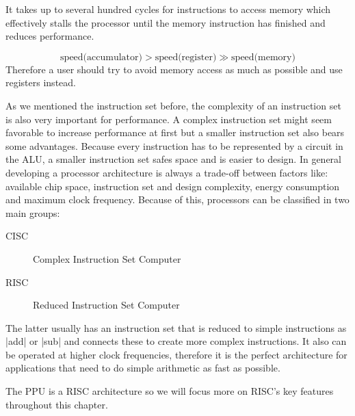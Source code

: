 It takes up to several hundred cycles for instructions to access memory which effectively stalls the processor until the memory instruction has finished and reduces performance.

\begin{equation*}
    \text{speed(accumulator)} > \text{speed(register)} \gg \text{speed(memory)}
\end{equation*}
Therefore a user should try to avoid memory access as much as possible and use registers instead.

As we mentioned the instruction set before, the complexity of an instruction set is also very important for performance. 
A complex instruction set might seem favorable to increase performance at first but a smaller instruction set also bears some advantages.
Because every instruction has to be represented by a circuit in the \ac{ALU}, a smaller instruction set safes space and is easier to design.
In general developing a processor architecture is always a trade-off between factors like: available chip space, instruction set and design complexity, energy consumption and maximum clock frequency.
Because of this, processors can be classified in two main groups:
\begin{description}
    \item[\acs{CISC}] Complex Instruction Set Computer
    \item[\acs{RISC}] Reduced Instruction Set Computer
\end{description}
The latter usually has an instruction set that is reduced to simple instructions as |add| or |sub| and connects these to create more complex instructions.
It also can be operated at higher clock frequencies, therefore it is the perfect architecture for applications that need to do simple arithmetic as fast as possible.

The \ac{PPU} is a RISC architecture so we will focus more on \ac{RISC}'s key features throughout this chapter.

